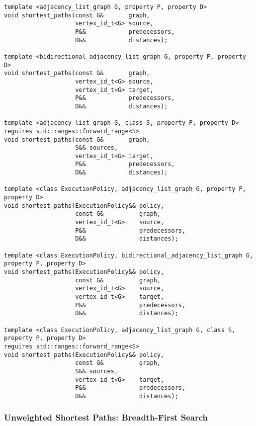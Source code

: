 \begin{lstlisting}
template <adjacency_list_graph G, property P, property D>
void shortest_paths(const G&       graph,
                    vertex_id_t<G> source,
                    P&&            predecessors,
                    D&&            distances);

template <bidirectional_adjacency_list_graph G, property P, property D>
void shortest_paths(const G&       graph,
                    vertex_id_t<G> source,
                    vertex_id_t<G> target,
                    P&&            predecessors,
                    D&&            distances);

template <adjacency_list_graph G, class S, property P, property D>
reguires std::ranges::forward_range<S>
void shortest_paths(const G&       graph,
                    S&& sources,
                    vertex_id_t<G> target,
                    P&&            predecessors,
                    D&&            distances);

template <class ExecutionPolicy, adjacency_list_graph G, property P, property D>
void shortest_paths(ExecutionPolicy&& policy,
                    const G&          graph,
                    vertex_id_t<G>    source,
                    P&&               predecessors,
                    D&&               distances);

template <class ExecutionPolicy, bidirectional_adjacency_list_graph G, property P, property D>
void shortest_paths(ExecutionPolicy&& policy,
                    const G&          graph,
                    vertex_id_t<G>    source,
                    vertex_id_t<G>    target,
                    P&&               predecessors,
                    D&&               distances);

template <class ExecutionPolicy, adjacency_list_graph G, class S, property P, property D>
reguires std::ranges::forward_range<S>
void shortest_paths(ExecutionPolicy&& policy,
                    const G&          graph,
                    S&& sources,
                    vertex_id_t<G>    target,
                    P&&               predecessors,
                    D&&               distances);
\end{lstlisting}



\subsubsection{Unweighted Shortest Paths: Breadth-First Search}

